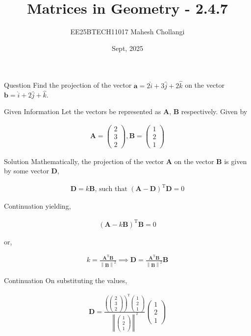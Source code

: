 \documentclass{beamer}
\title{Matrices in Geometry - 2.4.7}
\author{EE25BTECH11017 Mahesh Chollangi}
\date{Sept, 2025}
\let\vec\mathbf
\providecommand{\brak}[1]{\ensuremath{\left(#1\right)}}
\theoremstyle{remark}
\providecommand{\norm}[1]{\left\lVert#1\right\rVert}
\newcommand{\myvec}[1]{\ensuremath{\begin{pmatrix}#1\end{pmatrix}}}
\begin{document}
\maketitle

\frame{\titlepage}
\begin{frame}{Question}
    Find the projection of the vector $\vec{a} = 2\hat{i}+3\hat{j}+2\hat{k}$ on the vector $\vec{b} = \hat{i}+2\hat{j}+\hat{k}$.\\
\end{frame}

\begin{frame}{Given Information}
    Let the vectors be represented as \textbf{A}, \textbf{B} respectively. Given by

\begin{align}
    \textbf{A} = \myvec{2 \\ 3 \\ 2}, \textbf{B} = \myvec{1 \\ 2\\ 1} 
    \label{0.1}
\end{align}
\end{frame}

\begin{frame}{Solution}
    Mathematically, the projection of the vector \textbf{A} on the vector \textbf{B} is given by some vector \textbf{D},

\begin{align}
    \textbf{D} = k\textbf{B}\text{, such that } (\textbf{A}-\textbf{D})^\text{T}\textbf{D}=0
    \label{0.2}
\end{align}
\end{frame}

\begin{frame}{Continuation}
    yielding,

\begin{align}
    (\textbf{A}-k\textbf{B})^\text{T}\textbf{B}=0
    \label{0.3}
\end{align}

or,


\begin{align}
    k=\frac{\textbf{A}^\text{T}\textbf{B}}{\norm{\textbf{B}}^2} \implies \textbf{D} = \frac{\textbf{A}^\text{T}\textbf{B}}{\norm{\textbf{B}}^2}\textbf{B}
    \label{0.4}
\end{align}
\end{frame}

\begin{frame}{Continuation}
    On substituting the values,

\begin{align}
    \textbf{D} = \frac{\brak{\myvec{2\\3\\2}}^\text{T}\myvec{1\\2\\1}}{\norm{\myvec{1\\2\\1}}^2}\myvec{1\\2\\1}
    \label{0.5}
\end{align}
\end{frame}
\end{document}

